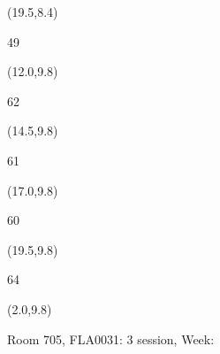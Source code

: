 \documentclass[a4paper]{article}
\newcommand{\myseat}[4]{%
\vspace{-0.1cm} \hspace{-0.5cm}
\parbox[t][2.2cm][t]{3.5cm}{%
\small #1 %
\begin{description}
\vspace{-0.1cm}
\item [ID:] #2
\vspace{-0.1cm}
\item [Team:] #3 \normalsize
\vspace{-0.1cm}
\item \normalsize #4
\vspace{-0.1cm}
\end{description}
}
}
\begin{document}
\begin{textblock}{2.5}(19.5,8.4)
\textblockcolor{}
\myseat{49}{}{}{}
\end{textblock}


\begin{textblock}{2.5}(12.0,9.8)
\textblockcolor{}
\myseat{62}{}{}{}
\end{textblock}

\begin{textblock}{2.5}(14.5,9.8)
\textblockcolor{}
\myseat{61}{}{}{}
\end{textblock}

\begin{textblock}{2.5}(17.0,9.8)
\textblockcolor{}
\myseat{60}{}{}{}
\end{textblock}

\begin{textblock}{2.5}(19.5,9.8)
\textblockcolor{}
\myseat{64}{}{}{}
\end{textblock}

\begin{textblock}{10}(2.0,9.8)
\textblockcolor{}
\parbox[t][2.2cm][t]{9.5cm}{%
\large Room 705, FLA0031: 3 session, Week: 
\vspace{-0.3cm} \hspace{-0.5cm}
}
\end{textblock}
\end{document}

